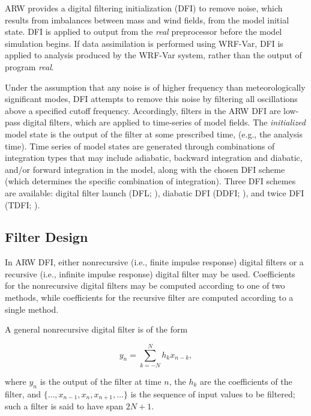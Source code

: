 ARW provides a digital filtering initialization (DFI) to 
remove noise, which results from imbalances between mass and wind fields, 
from the model initial state. DFI is applied to output from the {\it real} 
preprocessor before the model simulation begins. If data assimilation is 
performed using WRF-Var, DFI is applied to analysis produced by the 
WRF-Var system, rather than the output of program {\it real}.

Under the assumption that any noise is of 
higher frequency than meteorologically significant modes, DFI attempts to 
remove this noise by filtering all oscillations above a specified cutoff 
frequency. Accordingly, filters in the ARW DFI are low-pass digital 
filters, which are applied to time-series of model fields. The {\it initialized} 
model state is the output of the filter at some prescribed time, 
(e.g., the analysis time). Time series of model states are generated through 
combinations of integration types that may include adiabatic, backward integration and diabatic, and/or forward 
integration in the model, along with the chosen DFI scheme (which determines the 
specific combination of integration). Three DFI schemes are available: 
digital filter launch (DFL; \cite{lynchhuang94}), diabatic DFI (DDFI; \cite{huanglynch93}), 
and twice DFI (TDFI; \cite{lynchhuang94}).

\subsection{Filter Design}

In ARW DFI, either nonrecursive (i.e., finite impulse response) digital 
filters or a recursive (i.e., infinite impulse response) digital filter may 
be used. Coefficients for the nonrecursive digital filters may be 
computed according to one of two methods, while coefficients for the 
recursive filter are computed according to a single method.

A general nonrecursive digital filter is of the form

\begin{equation}
y_n = \sum_{k=-N}^{N} h_k x_{n-k},
\label{fir_filter}
\end{equation}

\noindent
where $y_n$ is the output of the filter at time $n$, the $h_k$ are the 
coefficients of the filter, and $\{ \ldots , x_{n-1}, x_n, x_{n+1}, \ldots \}$ 
is the sequence of input values to be filtered; such a filter is said to have 
span $2N+1$. 

